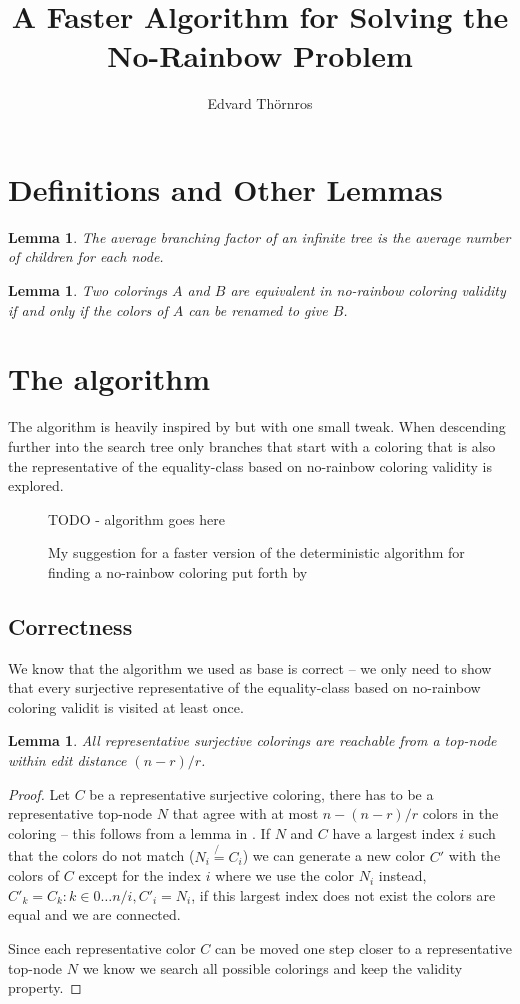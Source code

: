 \documentclass{article}
\title{A Faster Algorithm for Solving the No-Rainbow Problem}
\author{Edvard Thörnros}
\newtheorem{lemma}[theorem]{Lemma}
\begin{document}
\section{Definitions and Other Lemmas}
\begin{lemma}
The average branching factor of an infinite tree is the average number of children for each node.
\end{lemma}

\begin{lemma}
Two colorings $A$ and $B$ are equivalent in no-rainbow coloring validity if and only if the colors of $A$ can be renamed to give $B$.
\end{lemma}

\section{The algorithm}
The algorithm is heavily inspired by \citeauthor{parvini} but with one small tweak. When descending further into the search tree only branches that start with a coloring that is also the representative of the equality-class based on no-rainbow coloring validity is explored.

\begin{figure}[h!]
\centering
TODO - algorithm goes here
\caption{My suggestion for a faster version of the deterministic algorithm for finding a no-rainbow coloring put forth by \citeauthor{parvini}}
\label{alg:mine}
\end{figure}

\subsection{Correctness}
We know that the algorithm we used as base is correct \cite{parvini} -- we only need to show that every surjective representative of the equality-class based on no-rainbow coloring validit is visited at least once.

\begin{lemma}
All representative surjective colorings are reachable from a top-node within edit distance $(n-r)/r$.
\end{lemma}

\begin{proof}
Let $C$ be a representative surjective coloring, there has to be a representative top-node $N$ that agree with at most $n - (n-r)/r$ colors in the coloring -- this follows from a lemma in \cite{parvini}. If $N$ and $C$ have a largest index $i$ such that the colors do not match ($N_i \not{=} C_i$) we can generate a new color $C'$ with the colors of $C$ except for the index $i$ where we use the color $N_i$ instead, $C'_k = C_k : k \in { 0 \dots n } / { i }, C'_i = N_i$, if this largest index does not exist the colors are equal and we are connected.

Since each representative color $C$ can be moved one step closer to a representative top-node $N$ we know we search all possible colorings and keep the validity property.
\end{proof}
\end{document}
